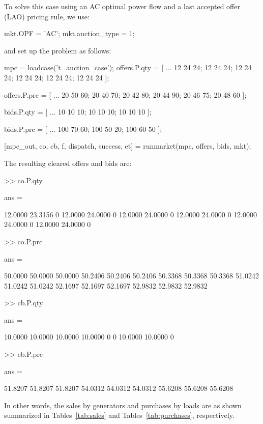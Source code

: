 \documentclass[12pt]{article}
\numberwithin{equation}{section}
\numberwithin{table}{section}
\numberwithin{figure}{section}
\begin{document}
\begin{appendices}
To solve this case using an AC optimal power flow and a last accepted offer (LAO) pricing rule, we use:

\begin{Code}
mkt.OPF = 'AC';
mkt.auction_type = 1;
\end{Code}
\clearpage
\noindent
and set up the problem as follows:
\begin{Code}
mpc = loadcase('t_auction_case');
offers.P.qty = [ ...
	12 24 24;
	12 24 24;
	12 24 24;
	12 24 24;
	12 24 24;
	12 24 24 ];

offers.P.prc = [ ...
	20 50 60;
	20 40 70;
	20 42 80;
	20 44 90;
	20 46 75;
	20 48 60 ];

bids.P.qty = [ ...
	10 10 10;
	10 10 10;
	10 10 10 ];
	
bids.P.prc = [ ...
	100 70 60;
	100 50 20;
	100 60 50 ];

[mpc_out, co, cb, f, dispatch, success, et] = runmarket(mpc, offers, bids, mkt);
\end{Code}
\clearpage
\noindent
The resulting cleared offers and bids are:
\begin{Code}
>> co.P.qty

ans =

   12.0000   23.3156         0
   12.0000   24.0000         0
   12.0000   24.0000         0
   12.0000   24.0000         0
   12.0000   24.0000         0
   12.0000   24.0000         0
 
>> co.P.prc

ans =

   50.0000   50.0000   50.0000
   50.2406   50.2406   50.2406
   50.3368   50.3368   50.3368
   51.0242   51.0242   51.0242
   52.1697   52.1697   52.1697
   52.9832   52.9832   52.9832

>> cb.P.qty

ans =

   10.0000   10.0000   10.0000
   10.0000         0         0
   10.0000   10.0000         0

>> cb.P.prc

ans =

   51.8207   51.8207   51.8207
   54.0312   54.0312   54.0312
   55.6208   55.6208   55.6208
\end{Code}

\clearpage
In other words, the sales by generators and purchases by loads are as shown summarized in Tables~\ref{tab:sales} and Tables~\ref{tab:purchases}, respectively.


\end{appendices}
\end{document}
